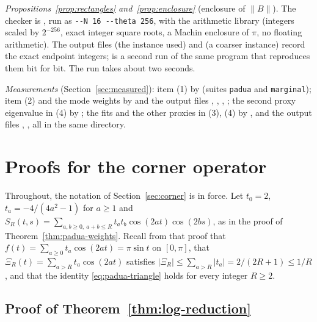 \documentclass[preprint,12pt,a4paper]{elsarticle}
\theoremstyle{remark}
\begin{document}
\emph{Propositions~\ref{prop:rectangles} and~\ref{prop:enclosure}} (enclosure of
$\|B\|$). The checker is
, run as
 \verb|--N 16 --theta 256|, with the arithmetic library
 (integers scaled by $2^{-256}$, exact integer
square roots, a Machin enclosure of $\pi$, no floating arithmetic). The output files
 (the instance used) and
 (a coarser instance) record the exact
endpoint integers;  is a second run
of the same program that reproduces them bit for bit. The run takes about two seconds.

\emph{Measurements} (Section~\ref{sec:measured}): item (1) by
 (suites \texttt{padua} and
\texttt{marginal}); item (2) and the mode weights by
 and the output files
, , ,
; the second proxy eigenvalue in (4) by
; the fits and the other proxies in (3), (4) by
,  and the output files
, , all in
the same directory.

\endgroup

\appendix
\renewcommand{\thesection}{\Alph{section}}
\section{Proofs for the corner operator}\label{app:corner}

Throughout, the notation of Section~\ref{sec:corner} is in force. Let
$t_0=2$, $t_a=-4/(4a^2-1)$ for $a\ge1$ and
$S_R(t,s)=\sum_{a,b\ge0,\ a+b\le R}t_at_b\cos(2at)\cos(2bs)$, as in the proof
of Theorem~\ref{thm:padua-weights}. Recall from that proof that
$f(t)=\sum_{a\ge0}t_a\cos(2at)=\pi\sin t$ on $[0,\pi]$, that
$\Xi_R(t)=\sum_{a>R}t_a\cos(2at)$ satisfies $|\Xi_R|\le\sum_{a>R}|t_a|=2/(2R+1)\le1/R$,
and that the identity \eqref{eq:padua-triangle} holds for every integer
$R\ge2$.

\subsection{Proof of Theorem~\ref{thm:log-reduction}}\label{app:reduction}
\end{document}
